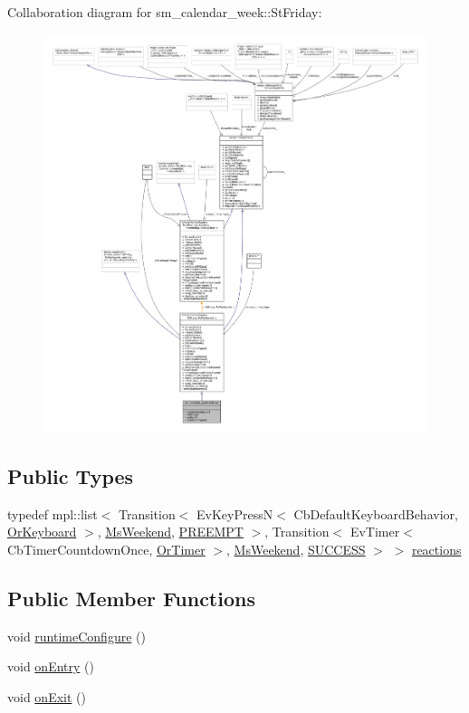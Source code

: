 Collaboration diagram for sm\+\_\+calendar\+\_\+week\+:\+:St\+Friday\+:
\nopagebreak
\begin{figure}[H]
\begin{center}
\leavevmode
\includegraphics[width=350pt]{structsm__calendar__week_1_1StFriday__coll__graph}
\end{center}
\end{figure}
\subsection*{Public Types}
\begin{DoxyCompactItemize}
\item 
typedef mpl\+::list$<$ Transition$<$ Ev\+Key\+PressN$<$ Cb\+Default\+Keyboard\+Behavior, \hyperlink{classsm__calendar__week_1_1OrKeyboard}{Or\+Keyboard} $>$, \hyperlink{classsm__calendar__week_1_1MsWeekend}{Ms\+Weekend}, \hyperlink{classPREEMPT}{P\+R\+E\+E\+M\+PT} $>$, Transition$<$ Ev\+Timer$<$ Cb\+Timer\+Countdown\+Once, \hyperlink{classsm__calendar__week_1_1OrTimer}{Or\+Timer} $>$, \hyperlink{classsm__calendar__week_1_1MsWeekend}{Ms\+Weekend}, \hyperlink{classSUCCESS}{S\+U\+C\+C\+E\+SS} $>$ $>$ \hyperlink{structsm__calendar__week_1_1StFriday_a3086092f43c6f0426130aa46b55edaab}{reactions}
\end{DoxyCompactItemize}
\subsection*{Public Member Functions}
\begin{DoxyCompactItemize}
\item 
void \hyperlink{structsm__calendar__week_1_1StFriday_a5fce56702b4d55872f82dc77194e9067}{runtime\+Configure} ()
\item 
void \hyperlink{structsm__calendar__week_1_1StFriday_a7ae9cb47276595837bf899e41ab6c03f}{on\+Entry} ()
\item 
void \hyperlink{structsm__calendar__week_1_1StFriday_a582bb483355ac2ba7038e999d44d4b4e}{on\+Exit} ()
\end{DoxyCompactItemize}

